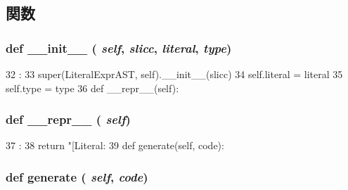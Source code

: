 \subsection{関数}
\hypertarget{classslicc_1_1ast_1_1LiteralExprAST_1_1LiteralExprAST_ac775ee34451fdfa742b318538164070e}{
\subsubsection[{\_\-\_\-init\_\-\_\-}]{\setlength{\rightskip}{0pt plus 5cm}def \_\-\_\-init\_\-\_\- ( {\em self}, \/   {\em slicc}, \/   {\em literal}, \/   {\em type})}}
\label{classslicc_1_1ast_1_1LiteralExprAST_1_1LiteralExprAST_ac775ee34451fdfa742b318538164070e}



\begin{DoxyCode}
32                                             :
33         super(LiteralExprAST, self).__init__(slicc)
34         self.literal = literal
35         self.type = type
36 
    def __repr__(self):
\end{DoxyCode}
\hypertarget{classslicc_1_1ast_1_1LiteralExprAST_1_1LiteralExprAST_ad8b9328939df072e4740cd9a63189744}{
\subsubsection[{\_\-\_\-repr\_\-\_\-}]{\setlength{\rightskip}{0pt plus 5cm}def \_\-\_\-repr\_\-\_\- ( {\em self})}}
\label{classslicc_1_1ast_1_1LiteralExprAST_1_1LiteralExprAST_ad8b9328939df072e4740cd9a63189744}



\begin{DoxyCode}
37                       :
38         return "[Literal: %
39 
    def generate(self, code):
\end{DoxyCode}
\hypertarget{classslicc_1_1ast_1_1LiteralExprAST_1_1LiteralExprAST_a4555d1cee0dccf3942ea35fe86de2e8e}{
\subsubsection[{generate}]{\setlength{\rightskip}{0pt plus 5cm}def generate ( {\em self}, \/   {\em code})}}
\label{classslicc_1_1ast_1_1LiteralExprAST_1_1LiteralExprAST_a4555d1cee0dccf3942ea35fe86de2e8e}



